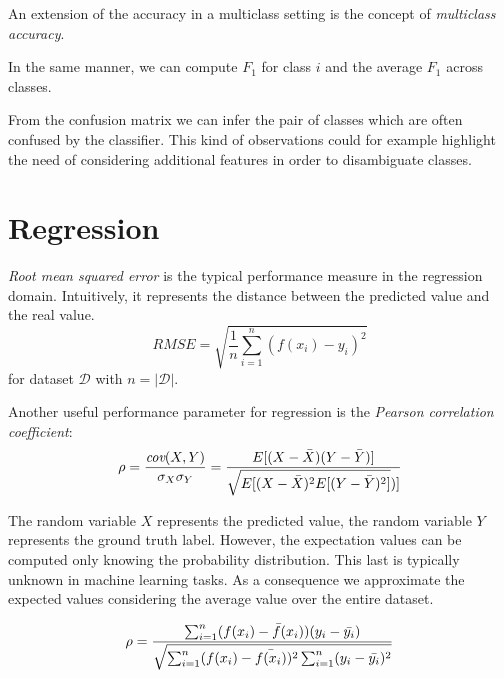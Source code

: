 An extension of the accuracy in a multiclass setting is the concept of \textit{multiclass accuracy}.


In the same manner, we can compute $F_1$ for class $i$ and the average $F_1$ across classes. \newline

From the confusion matrix we can infer the pair of classes which are often confused by the classifier. This kind of observations could for example highlight the need of considering additional features in order to disambiguate classes.

\section{Regression}
\textit{Root mean squared error} is the typical performance measure in the regression domain. Intuitively, it represents the distance between the predicted value and the real value.
\begin{equation}
    \textit{RMSE} = \sqrt{\frac{1}{n} \sum_{i=1}^n(f(x_i)-y_i)^2}
\end{equation}
for dataset $\mathcal{D}$ with $n=|\mathcal{D}|$. \newline

Another useful performance parameter for regression is the \textit{Pearson correlation coefficient}:
\begin{equation*}
    \rho = \frac{\textit{cov}(X,Y)}{\sigma_X \sigma_Y} = \frac{E[(X-\Bar{X})(Y-\Bar{Y})]}{\sqrt{E[(X-\Bar{X})^2 E[(Y-\Bar{Y})^2]})]}
\end{equation*}

The random variable $X$ represents the predicted value, the random variable $Y$ represents the ground truth label. However, the expectation values can be computed only knowing the probability distribution. This last is typically unknown in machine learning tasks. As a consequence we approximate the expected values considering the average value over the entire dataset.

\begin{equation}
    \rho = \frac{\sum_{i=1}^n (f(x_i)-\Bar{f}(x_i))(y_i-\Bar{y_i})}{\sqrt{\sum_{i=1}^n (f(x_i)-\Bar{f(x_i)})^2 \sum_{i=1}^n (y_i - \Bar{y_i})^2}}
\end{equation}

